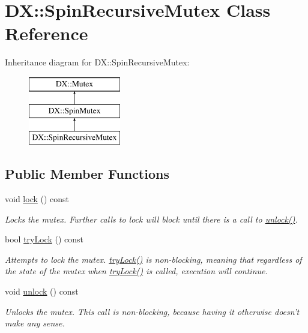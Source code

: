 \hypertarget{class_d_x_1_1_spin_recursive_mutex}{\section{D\-X\-:\-:Spin\-Recursive\-Mutex Class Reference}
\label{class_d_x_1_1_spin_recursive_mutex}
}
Inheritance diagram for D\-X\-:\-:Spin\-Recursive\-Mutex\-:\begin{figure}[H]
\begin{center}
\leavevmode
\includegraphics[height=3.000000cm]{class_d_x_1_1_spin_recursive_mutex}
\end{center}
\end{figure}
\subsection*{Public Member Functions}
\begin{DoxyCompactItemize}
\item 
void \hyperlink{class_d_x_1_1_spin_recursive_mutex_a928053922f1a59db49d6027d108b88ba}{lock} () const 
\begin{DoxyCompactList}\small\item\em Locks the mutex. Further calls to lock will block until there is a call to \hyperlink{class_d_x_1_1_spin_recursive_mutex_aa470bb06feb399e8771296a79b888287}{unlock()}. \end{DoxyCompactList}\item 
bool \hyperlink{class_d_x_1_1_spin_recursive_mutex_a9150334e2741a1de69f177491214cf15}{try\-Lock} () const 
\begin{DoxyCompactList}\small\item\em Attempts to lock the mutex. \hyperlink{class_d_x_1_1_spin_recursive_mutex_a9150334e2741a1de69f177491214cf15}{try\-Lock()} is non-\/blocking, meaning that regardless of the state of the mutex when \hyperlink{class_d_x_1_1_spin_recursive_mutex_a9150334e2741a1de69f177491214cf15}{try\-Lock()} is called, execution will continue. \end{DoxyCompactList}\item 
\hypertarget{class_d_x_1_1_spin_recursive_mutex_aa470bb06feb399e8771296a79b888287}{void \hyperlink{class_d_x_1_1_spin_recursive_mutex_aa470bb06feb399e8771296a79b888287}{unlock} () const }\label{class_d_x_1_1_spin_recursive_mutex_aa470bb06feb399e8771296a79b888287}

\begin{DoxyCompactList}\small\item\em Unlocks the mutex. This call is non-\/blocking, because having it otherwise doesn't make any sense. \end{DoxyCompactList}\end{DoxyCompactItemize}

